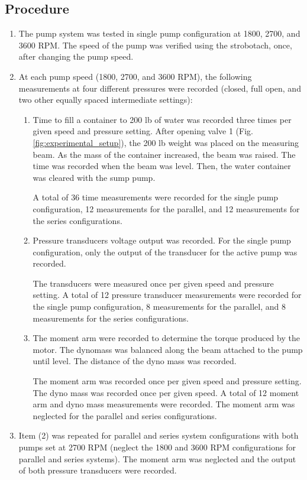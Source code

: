 \subsection{Procedure}
\begin{enumerate}[label=\arabic*.]
    \item The pump system was tested in single pump configuration at 1800, 2700, and 3600 RPM. The speed of the pump was verified using the strobotach, once, after changing the pump speed.
    \item At each pump speed (1800, 2700, and 3600 RPM), the following measurements at four different pressures were recorded (closed, full open, and two other equally spaced intermediate settings):
    \begin{enumerate}[label=\roman*.]
        \item Time to fill a container to 200 lb of water was recorded three times per given speed and pressure setting. After opening valve 1 (Fig.\ref{fig:experimental_setup}), the 200 lb weight was placed on the measuring beam. As the mass of the container increased, the beam was raised. The time was recorded when the beam was level. Then, the water container was cleared with the sump pump. 
        
        \indent A total of 36 time measurements were recorded for the single pump configuration, 12 measurements for the parallel, and 12 measurements for the series configurations.
        \item Pressure transducers voltage output was recorded. For the single pump configuration, only the output of the transducer for the active pump was recorded. 
        
        \indent The transducers were measured once per given speed and pressure setting. A total of 12 pressure transducer measurements were recorded for the single pump configuration, 8 measurements for the parallel, and 8 measurements for the series configurations. 
        \item The moment arm were recorded to determine the torque produced by the motor. The dynomass was balanced along the beam attached to the pump until level. The distance of the dyno mass was recorded.
        
        \indent The moment arm was recorded once per given speed and pressure setting. The dyno mass was recorded once per given speed. A total of 12 moment arm and dyno mass measurements were recorded. The moment arm was neglected for the parallel and series configurations.
    \end{enumerate}
    \item Item (2) was repeated for parallel and series system configurations with both pumps set at 2700 RPM (neglect the 1800 and 3600 RPM configurations for parallel and series systems). The moment arm was neglected and the output of both pressure transducers were recorded.
\end{enumerate}